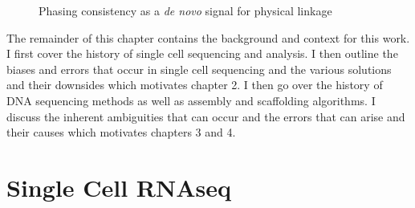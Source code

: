 \begin{figure}[htbp!]
\begin{centering}

\caption{Phasing consistency as a \textit{de novo} signal for physical linkage}\label{fig:phasstools}
\end{centering}
\end{figure}

\par{
The remainder of this chapter contains the background and context for this work. I first cover the history of single cell sequencing and analysis. I then outline the biases and errors that occur in single cell sequencing and the various solutions and their downsides which motivates chapter 2. I then go over the history of DNA sequencing methods as well as assembly and scaffolding algorithms. I discuss the inherent ambiguities that can occur and the errors that can arise and their causes which motivates chapters 3 and 4.
}

\section{Single Cell RNAseq}

